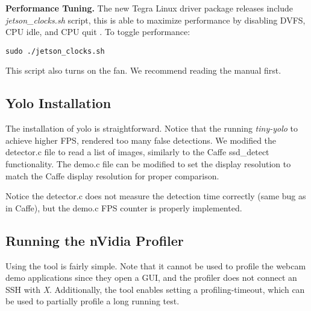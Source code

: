\textbf{Performance Tuning.}
The new Tegra Linux driver package releases include \textit{jetson\_clocks.sh} script, this is able to maximize performance by disabling DVFS, CPU idle, and CPU quit \cite{tegradriverpack242}. To toggle performance:
\begin{lstlisting} 
sudo ./jetson_clocks.sh
\end{lstlisting}
This script also turns on the fan. We recommend reading the manual first.

\subsection{Yolo Installation}
The installation of yolo is straightforward. Notice that the running \textit{tiny-yolo} to achieve higher FPS, rendered too many false detections.
We modified the detector.c file to read a list of images, similarly to the Caffe ssd\_detect functionality. The demo.c file can be modified to set the display resolution to match the Caffe display resolution for proper comparison.

Notice the detector.c does not measure the detection time correctly (same bug as in Caffe), but the demo.c FPS counter is properly implemented.

\subsection{Running the nVidia Profiler}
Using the tool is fairly simple. Note that it cannot be used to profile the webcam demo applications since they open a GUI, and the profiler does not connect an SSH with \textit{X}. Additionally, the tool enables setting a profiling-timeout, which can be used to partially profile a long running test. 

